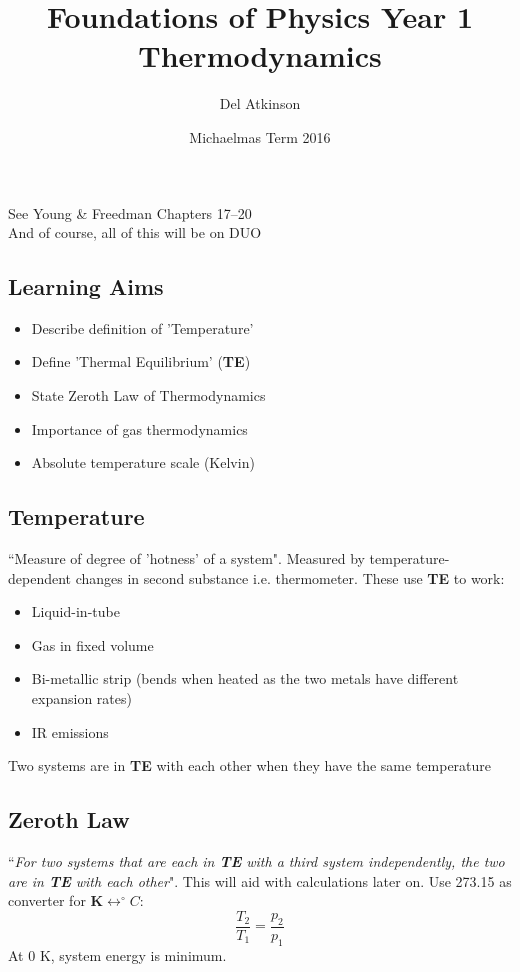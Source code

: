 \documentclass[a4paper, 11pt, normalem]{report}
\title{Foundations of Physics Year 1 \\ Thermodynamics \vspace{-20pt}}
\author{Del Atkinson}
\date{\vspace{-15pt}Michaelmas Term 2016}
\begin{document}
\maketitle
\tableofcontents

\chapter{}
See Young \& Freedman Chapters 17--20 \\
And of course, all of this will be on DUO
\section{Learning Aims}
\begin{itemize}
    \item Describe definition of 'Temperature'
    \item Define 'Thermal Equilibrium' (\textbf{TE})
    \item State Zeroth Law of Thermodynamics
    \item Importance of gas thermodynamics
    \item Absolute temperature scale (Kelvin)
\end{itemize}

\section{Temperature}
``Measure of degree of 'hotness' of a system".
Measured by temperature-dependent changes in second substance i.e. thermometer.
These use \textbf{TE} to work:
\begin{itemize}
    \item Liquid-in-tube
    \item Gas in fixed volume
    \item Bi-metallic strip (bends when heated as the two metals have different expansion rates)
    \item IR emissions
\end{itemize}
Two systems are in \textbf{TE} with each other when they have the same temperature

\section{Zeroth Law}
``\textit{For two systems that are each in \textbf{TE} with a third system independently, the two are in \textbf{TE} with each other}".
This will aid with calculations later on. 
Use 273.15 as converter for $\textbf{K}\leftrightarrow ^{\circ}C$:
\begin{equation}
    \dfrac{T_{2}}{T_{1}} = \dfrac{p_{2}}{p_{1}}
\end{equation}
At 0 K, system energy is minimum.
\end{document}
